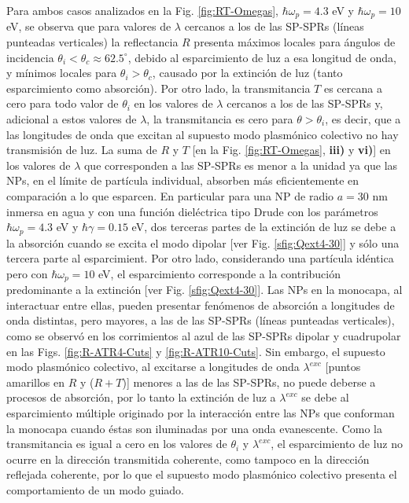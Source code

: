 Para ambos casos analizados en la Fig. \ref{fig:RT-Omegas}, $\hbar\omega_p = 4.3$ eV y $\hbar\omega_p = 10$ eV, se observa que para valores de $\lambda$ cercanos a los de las SP-SPRs (líneas punteadas verticales) la reflectancia $R$ presenta máximos locales para ángulos de incidencia $\theta_i<\theta_c \approx 62.5^\circ$, debido al esparcimiento de luz a esa longitud de onda, y mínimos locales para $\theta_i>\theta_c$, causado por la extinción de luz (tanto esparcimiento como absorción). Por otro lado, la transmitancia $T$ es cercana a cero para todo valor de $\theta_i$ en los valores de $\lambda$ cercanos a los de las SP-SPRs y, adicional a estos valores de $\lambda$, la transmitancia es cero para $\theta>\theta_i$, es decir, que a las longitudes de onda que excitan al supuesto modo plasmónico colectivo no hay transmisión de luz. La suma de $R$ y $T$ [en la Fig. \ref{fig:RT-Omegas}, \textbf{iii)} y \textbf{vi)}] en los valores de $\lambda$ que corresponden a las SP-SPRs es menor a la unidad ya que las NPs, en el límite de partícula individual, absorben más eficientemente en comparación a lo que esparcen. En particular para una NP de radio $a=30$ nm inmersa en agua y con una función dieléctrica tipo Drude con los parámetros $\hbar\omega_p=4.3$ eV  y $\hbar\gamma=0.15$ eV, dos terceras partes de la extinción de luz se debe a la absorción  cuando se excita el modo dipolar [ver Fig. \ref{sfig:Qext4-30}] y sólo una tercera parte al esparcimient. Por otro lado, considerando una partícula idéntica pero con $\hbar\omega_p = 10$ eV, el esparcimiento corresponde a la contribución predominante a la extinción [ver Fig. \ref{sfig:Qext4-30}]. Las NPs en la monocapa, al interactuar entre ellas, pueden presentar fenómenos de absorción a longitudes de onda distintas, pero mayores, a las de las SP-SPRs (líneas punteadas verticales), como se observó en los corrimientos al azul de las SP-SPRs dipolar y cuadrupolar en las Figs. \ref{fig:R-ATR4-Cuts} y \ref{fig:R-ATR10-Cuts}. Sin embargo, el supuesto modo plasmónico colectivo, al excitarse a longitudes de onda $\lambda^{exc}$ [puntos amarillos en $R$ y ($R+T$)]  menores a las de las SP-SPRs, no puede deberse a procesos de absorción, por lo tanto la extinción de luz a   $\lambda^{exc}$   se debe al esparcimiento múltiple originado por la interacción entre las NPs que conforman la monocapa cuando éstas son iluminadas por una onda evanescente. Como la transmitancia es igual a cero en los valores de $\theta_i$ y $\lambda^{exc}$, el esparcimiento de luz no ocurre en la dirección transmitida coherente, como tampoco en la dirección reflejada coherente, por lo que el supuesto modo plasmónico colectivo presenta el comportamiento de un modo guiado.

